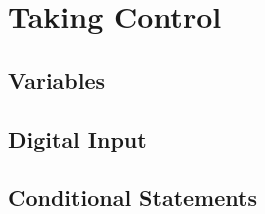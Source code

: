 \section{Taking Control}
\label{sec:taking_control}

\subsection{Variables}
\label{sub:variables}


\subsection{Digital Input}
\label{sub:digital_input}


\subsection{Conditional Statements}
\label{sub:conditional_statements}
